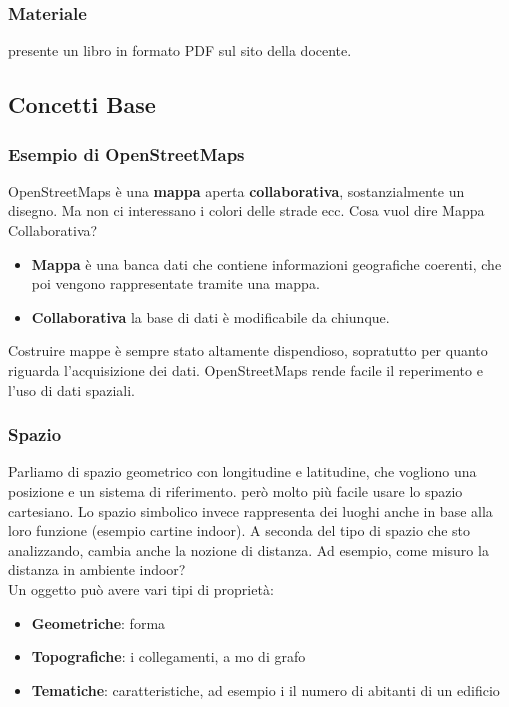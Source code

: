 \documentclass[a4paper,12pt]{article}
\begin{document}
\subsubsection{Materiale}
\E presente un libro in formato PDF sul sito della docente.


\subsection{Concetti Base}
\subsubsection{Esempio di OpenStreetMaps}
OpenStreetMaps è una \textbf{mappa} aperta \textbf{collaborativa}, sostanzialmente un disegno. Ma non ci interessano i colori delle strade ecc. Cosa vuol dire Mappa Collaborativa?
\begin{itemize}
 \item \textbf{Mappa} è una banca dati che contiene informazioni geografiche coerenti, che poi vengono rappresentate tramite una mappa.
 \item \textbf{Collaborativa} la base di dati è modificabile da chiunque.\\
\end{itemize}


Costruire mappe è sempre stato altamente dispendioso, sopratutto per quanto riguarda l'acquisizione dei dati. OpenStreetMaps rende facile il reperimento e l'uso di dati spaziali.

\subsubsection{Spazio}
Parliamo di spazio geometrico con longitudine e latitudine, che vogliono una posizione e un sistema di riferimento. \E però molto più facile usare lo spazio cartesiano. Lo spazio simbolico invece rappresenta dei luoghi anche in base alla loro funzione (esempio cartine indoor). A seconda del tipo di spazio che sto analizzando, cambia anche la nozione di distanza. Ad esempio, come misuro la distanza in ambiente indoor?\\
Un oggetto può avere vari tipi di proprietà:
\begin{itemize}
\item \textbf{Geometriche}: forma
\item \textbf{Topografiche}: i collegamenti, a mo di grafo
\item \textbf{Tematiche}: caratteristiche, ad esempio i il numero di abitanti di un edificio
\end{itemize}
\end{document}
